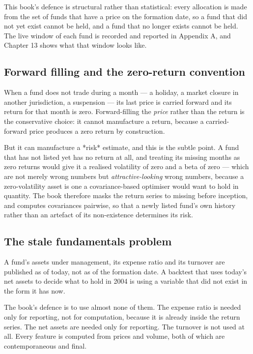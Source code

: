 This book's defence is structural rather than statistical: every
allocation is made from the set of funds that have a price on the
formation date, so a fund that did not yet exist cannot be held, and a
fund that no longer exists cannot be held. The live window of each fund is
recorded and reported in Appendix A, and Chapter 13 shows what that window
looks like.

\subsection{Forward filling and the zero-return convention}

When a fund does not trade during a month --- a holiday, a market closure
in another jurisdiction, a suspension --- its last price is carried forward
and its return for that month is zero. Forward-filling the \emph{price}
rather than the return is the conservative choice: it cannot manufacture a
return, because a carried-forward price produces a zero return by
construction.

But it can manufacture a *risk* estimate, and this is the subtle point.
A fund that has not listed yet has no return at all, and treating its
missing months as zero returns would give it a realised volatility of
zero and a beta of zero --- which are not merely wrong numbers but
\emph{attractive-looking} wrong numbers, because a zero-volatility asset
is one a covariance-based optimiser would want to hold in quantity. The
book therefore masks the return series to missing before inception, and
computes covariances pairwise, so that a newly listed fund's own history
rather than an artefact of its non-existence determines its risk.

\subsection{The stale fundamentals problem}

A fund's assets under management, its expense ratio and its turnover are
published as of today, not as of the formation date. A backtest that uses
today's net assets to decide what to hold in 2004 is using a variable that
did not exist in the form it has now.

The book's defence is to use almost none of them. The expense ratio is
needed only for reporting, not for computation, because it is already
inside the return series. The net assets are needed only for reporting.
The turnover is not used at all. Every feature is computed from prices and
volume, both of which are contemporaneous and final.


